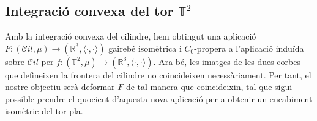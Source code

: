 




    
\subsection{Integració convexa del tor $\mathbb T^2$}
Amb la integració convexa del cilindre, hem obtingut una aplicació $F:(\mathcal Cil, \mu)\to(\mathbb R^3, \langle\cdot, \cdot\rangle)$ gairebé isomètrica i $C_0$-propera a l'aplicació induïda sobre $\mathcal Cil$ per $f:(\mathbb T^2, \mu)\to(\mathbb R^3, \langle\cdot, \cdot\rangle)$. Ara bé, les imatges de les dues corbes que defineixen la frontera del cilindre no coincideixen necessàriament. Per tant, el nostre objectiu serà deformar $F$ de tal manera que coincideixin, tal que sigui possible prendre el quocient d'aquesta nova aplicació per a obtenir un encabiment isomètric del tor pla.

